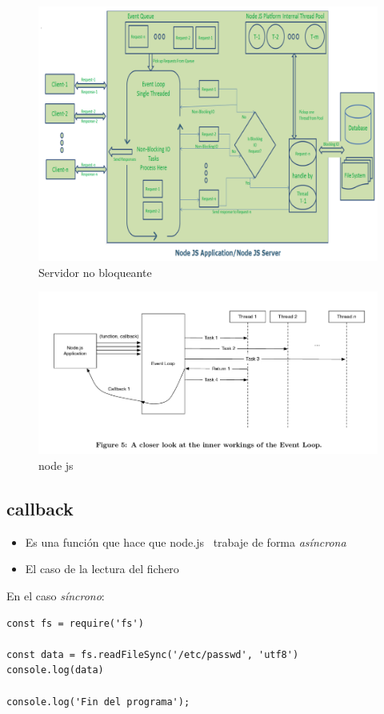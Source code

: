 \documentclass[4paper]{article}
\newcommand{\N}{node.js}
\begin{document}
\begin{figure}[H]
\includegraphics[scale=0.3]{../imagenes/eventloop.png}
\caption{Servidor no bloqueante}
\end{figure}

\begin{figure}[H]
\includegraphics[scale=0.5]{../imagenes/hilos.png}
\caption{node js}
\end{figure}

\newpage
\subsection{callback}

\begin{itemize}
\item Es una función que hace que \N ~ trabaje de forma \emph{asíncrona}
\item El caso de la lectura del fichero
\end{itemize}
En el caso \emph{síncrono}:
\begin{lstlisting}
const fs = require('fs')

const data = fs.readFileSync('/etc/passwd', 'utf8')
console.log(data)

console.log('Fin del programa');

\end{lstlisting}
\end{document}

